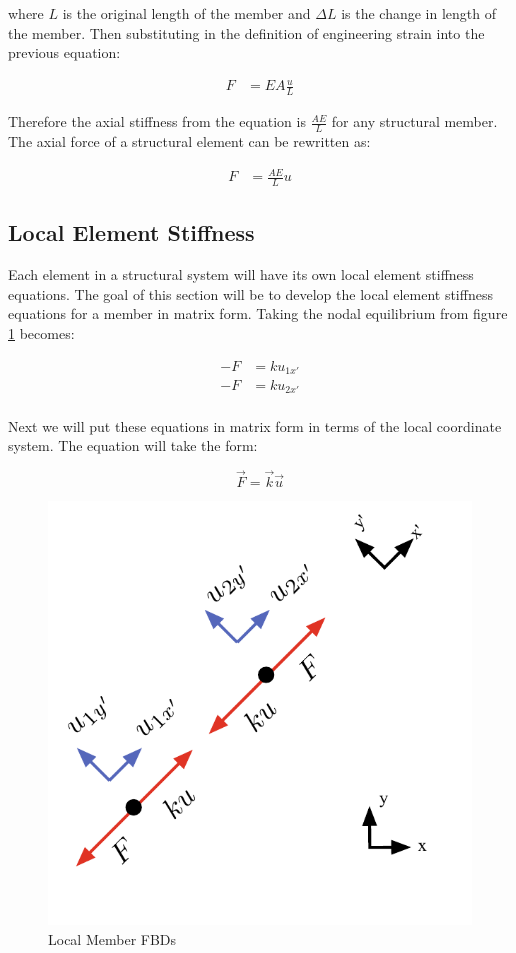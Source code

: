 where $L$ is the original length of the member and $\Delta L$ is the change in length of the member. Then substituting in the definition of engineering strain into the previous equation:

\begin{align}
	F & = EA \frac{u}{L}
\end{align}

Therefore the axial stiffness from the equation is $\frac{AE}{L}$ for any structural member. The axial force of a structural element can be rewritten as:

\begin{align}
	F & = \frac{AE}{L} u
\end{align}

\subsection{Local Element Stiffness}
Each element in a structural system will have its own local element stiffness equations. The goal of this section will be to develop the local element stiffness equations for a member in matrix form. Taking the nodal equilibrium from figure \ref{fig:LocalMemberStiffness} becomes:

\begin{align*}
	-F &= ku_{1x'}\\
	-F &= ku_{2x'}\\
\end{align*}

Next we will put these equations in matrix form in terms of the local coordinate system. The equation will take the form:

\begin{equation}
	\vec{F} = \vec{k} \vec{u}
\end{equation}

\begin{center}
	\begin{figure}[h]	\centerline{\includegraphics[width=0.7\columnwidth]{Figures/LocalMemberStiffness}}
		\caption{Local Member FBDs}
		\label{fig:LocalMemberStiffness}
	\end{figure}
\end{center}


